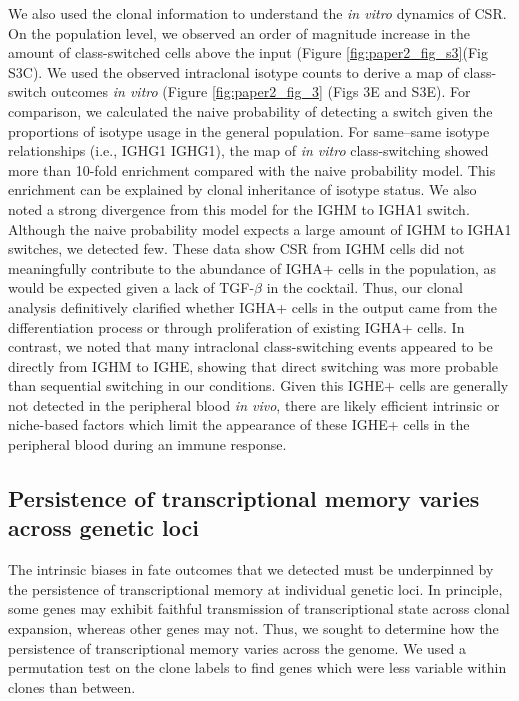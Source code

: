 We also used the clonal information to understand the \textit{in vitro} dynamics of CSR. On the population level, we observed an order of magnitude increase in the amount of class-switched cells above the input (Figure \ref{fig:paper2_fig_s3}(Fig S3C). We used the observed intraclonal isotype counts to derive a map of class-switch outcomes \textit{in vitro} (Figure \ref{fig:paper2_fig_3} (Figs 3E and S3E). For comparison, we calculated the naive probability of detecting a switch given the proportions of isotype usage in the general population. For same–same isotype relationships (i.e., IGHG1 IGHG1), the map of \textit{in vitro} class-switching showed more than 10-fold enrichment compared with the naive probability model. This enrichment can be explained by clonal inheritance of isotype status. We also noted a strong divergence from this model for the IGHM to IGHA1 switch. Although the naive probability model expects a large amount of IGHM to IGHA1 switches, we detected few. These data show CSR from IGHM cells did not meaningfully contribute to the abundance of IGHA+ cells in the population, as would be expected given a lack of TGF-$\beta$ in the cocktail\cite{stavnezer_surprising_2009}. Thus, our clonal analysis definitively clarified whether IGHA+ cells in the output came from the differentiation process or through proliferation of existing IGHA+ cells. In contrast, we noted that many intraclonal class-switching events appeared to be directly from IGHM to IGHE, showing that direct switching was more probable than sequential switching in our conditions. Given this IGHE+ cells are generally not detected in the peripheral blood \textit{in vivo}, there are likely efficient intrinsic or niche-based factors which limit the appearance of these IGHE+ cells in the peripheral blood during an immune response.


\subsection{Persistence of transcriptional memory varies across genetic loci}
The intrinsic biases in fate outcomes that we detected must be underpinned by the persistence of transcriptional memory at individual genetic loci. In principle, some genes may exhibit faithful transmission of transcriptional state across clonal expansion, whereas other genes may not. Thus, we sought to determine how the persistence of transcriptional memory varies across the genome. We used a permutation test on the clone labels to find genes which were less variable within clones than between.

